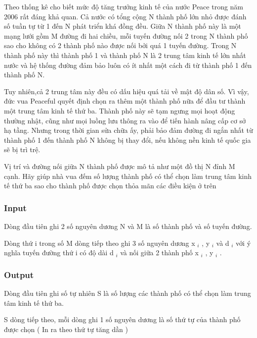 



   Theo thống kê cho biết mức độ tăng trưởng kinh tế của nước Peace trong năm 2006 rất đáng khả quan. Cả nước có tổng cộng N thành phố lớn nhỏ  được đánh số tuần tự từ 1 đến N phát triển khá đồng đều. Giữa N thành phố này là một mạng lưới gồm M đường đi hai chiều, mỗi tuyến đường nối 2 trong N thành phố sao cho không có 2 thành phố nào được nối bởi quá 1 tuyến đường. Trong N thành phố này thì thành phố 1 và thành phố N là 2 trung tâm kinh tế lớn nhất nước và hệ thống đường đảm bảo luôn có ít nhất một cách đi từ thành phố 1 đến thành phố N.  



   Tuy nhiên,cả 2 trung tâm này đều có dấu hiệu quá tải về mật độ dân số. Vì vậy, đức vua Peaceful quyết định chọn ra thêm một thành phố nữa để đầu tư thành một trung tâm kinh tế thứ ba. Thành phố này sẽ tạm ngưng mọi hoạt động thường nhật, cũng như mọi luồng lưu thông ra vào để tiến hành nâng cấp cơ sở hạ tầng. Nhưng trong thời gian sửa chữa ấy, phải bảo đảm đường đi ngắn nhất từ thành phố 1 đến thành phố N không bị thay đổi, nếu không nền kinh tế quốc gia sẽ bị trì trệ.  



   Vị trí và đường nối giữa N thành phố được mô tả như một đồ thị N đỉnh M cạnh. Hãy giúp nhà vua đếm số lượng thành phố có thể chọn làm trung tâm kinh tế thứ ba sao cho thành phố được chọn thỏa mãn các điều kiện ở trên  

\subsubsection{   Input  }

   Dòng đầu tiên ghi 2 số nguyên dương N và M là số thành phố và số tuyến đường.  

   Dòng thứ i trong số M dòng tiếp theo ghi 3 số nguyên dương x   $_    i   $   , y   $_    i   $   và d   $_    i   $   với ý nghĩa tuyến đường thứ i có độ dài d   $_    i   $   và nối giữa 2 thành phố x   $_    i   $   , y   $_    i   $   .  

\subsubsection{   Output  }

   Dòng đầu tiên ghi số tự nhiên S là số lượng các thành phố có thể chọn làm trung tâm kinh tế thứ ba.  

   S dòng tiếp theo, mỗi dòng ghi 1 số nguyên dương là số thứ tự của thành phố được chọn ( In ra theo thứ tự tăng dần )  

